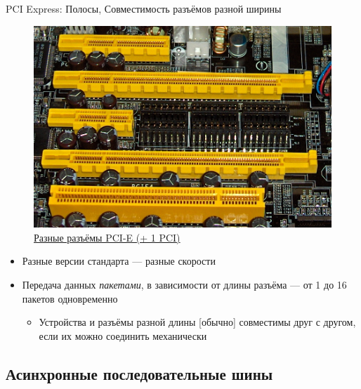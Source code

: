 \documentclass[xetex,aspectratio=43]{beamer}
\begin{document}
\begin{frame}{PCI Express: Полосы, Совместимость разъёмов разной ширины}
	\begin{figure}
        \includegraphics[height=0.5\textheight]{img/03.PCI-E_PCI_slots.jpg}
        \caption{\href{https://en.wikipedia.org/wiki/PCI_Express}{Разные разъёмы PCI-E (+ 1 PCI)}}
    \end{figure}
    \begin{itemize}
        \item Разные версии стандарта --- разные скорости
        \item Передача данных \emph{пакетами}, в зависимости от длины разъёма --- от 1 до 16 пакетов одновременно
        \begin{itemize}
            \item Устройства и разъёмы разной длины [обычно] совместимы друг с другом, если их можно соединить механически
        \end{itemize}
    \end{itemize}
\end{frame}

\subsection{Асинхронные последовательные шины}
\end{document}
